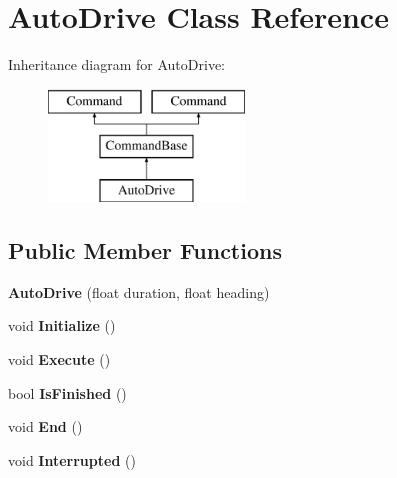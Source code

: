\hypertarget{class_auto_drive}{}\section{Auto\+Drive Class Reference}
\label{class_auto_drive}
Inheritance diagram for Auto\+Drive\+:\begin{figure}[H]
\begin{center}
\leavevmode
\includegraphics[height=3.000000cm]{class_auto_drive}
\end{center}
\end{figure}
\subsection*{Public Member Functions}
\begin{DoxyCompactItemize}
\item 
\hypertarget{class_auto_drive_a6aac0196fdfa467aef414ce062fb24c0}{}{\bfseries Auto\+Drive} (float duration, float heading)\label{class_auto_drive_a6aac0196fdfa467aef414ce062fb24c0}

\item 
\hypertarget{class_auto_drive_a026c34d4135957bbe8c55ce8fcc8bcdc}{}void {\bfseries Initialize} ()\label{class_auto_drive_a026c34d4135957bbe8c55ce8fcc8bcdc}

\item 
\hypertarget{class_auto_drive_a097de2ba33047e3aa8139d0843571c4f}{}void {\bfseries Execute} ()\label{class_auto_drive_a097de2ba33047e3aa8139d0843571c4f}

\item 
\hypertarget{class_auto_drive_aee442080b629b10d28255036a75680a1}{}bool {\bfseries Is\+Finished} ()\label{class_auto_drive_aee442080b629b10d28255036a75680a1}

\item 
\hypertarget{class_auto_drive_a90581f9ac36a54aa49ea8fcd2ce7388f}{}void {\bfseries End} ()\label{class_auto_drive_a90581f9ac36a54aa49ea8fcd2ce7388f}

\item 
\hypertarget{class_auto_drive_a2efe37771158e5dcae2d96754ca5c9dd}{}void {\bfseries Interrupted} ()\label{class_auto_drive_a2efe37771158e5dcae2d96754ca5c9dd}

\end{DoxyCompactItemize}

